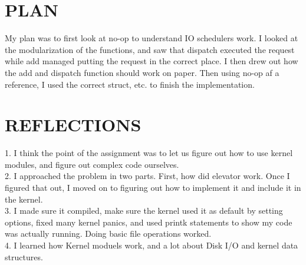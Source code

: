 \documentclass[letterpaper,10pt,titlepage]{article}
\begin{document}
\section{PLAN}
    My plan was to first look at no-op to understand IO schedulers work. I looked at the modularization of the functions, and saw
    that dispatch executed the request while add managed putting the request in the correct place. I then drew out how the add and
    dispatch function should work on paper. Then using no-op af a reference, I used the correct struct, etc. to finish the
    implementation.

\section{REFLECTIONS}
    1. I think the point of the assignment was to let us figure out how to use kernel modules, and figure out complex code ourselves.\\
    2. I approached the problem in two parts. First, how did elevator work. Once I figured that out, I moved on to figuring out how to implement it and include it in the kernel.\\
    3. I made sure it compiled, make sure the kernel used it as default by setting options, fixed many kernel panics, and used printk statements to show my code was actually running. Doing basic file operations worked. \\
    4. I learned how Kernel moduels work, and a lot about Disk I/O and kernel data structures. \\ 


\end{document}
